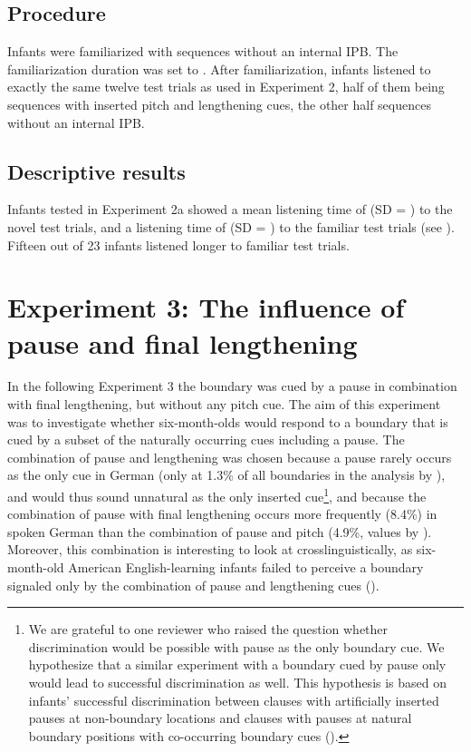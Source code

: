 \documentclass[output=paper]{langscibook}
\begin{document}
\subsection{Procedure}
Infants were familiarized with sequences without an internal IPB. The familiarization duration was set to . After familiarization, infants listened to exactly the same twelve test trials as used in Experiment 2, half of them being sequences with inserted pitch and lengthening cues, the other half sequences without an internal IPB.

\subsection{Descriptive results}
Infants tested in Experiment 2a showed a mean listening time of  (SD = ) to the novel test trials, and a listening time of  (SD = ) to the familiar test trials (see ). Fifteen out of 23 infants listened longer to familiar test trials.



\section{Experiment 3: The influence of pause and final lengthening}\largerpage

In the following Experiment 3 the boundary was cued by a pause in combination with final lengthening, but without any pitch cue. The aim of this experiment was to investigate whether six-month-olds would respond to a boundary that is cued by a subset of the naturally occurring cues including a pause. The combination of pause and lengthening was chosen because a pause rarely occurs as the only cue in German (only at 1.3\% of all boundaries in the analysis by \citealt{Peters2005PhonetMerk}), and would thus sound unnatural as the only inserted cue\footnote{We are grateful to one reviewer who raised the question whether discrimination would be possible with pause as the only boundary cue. We hypothesize that a similar experiment with a boundary cued by pause only would lead to successful discrimination as well. This hypothesis is based on infants’ successful discrimination between clauses with artificially inserted pauses at non-boundary locations and clauses with pauses at natural boundary positions with co-occurring boundary cues (\citealt{Schmitz2008}).}, and because the combination of pause with final lengthening occurs more frequently (8.4\%) in spoken German than the combination of pause and pitch (4.9\%, values by \citealt{Peters2005PhonetMerk}). Moreover, this combination is interesting to look at crosslinguistically, as six-month-old American English-learning infants failed to perceive a boundary signaled only by the combination of pause and lengthening cues (\citealt{Seidl2007}).
\end{document}
